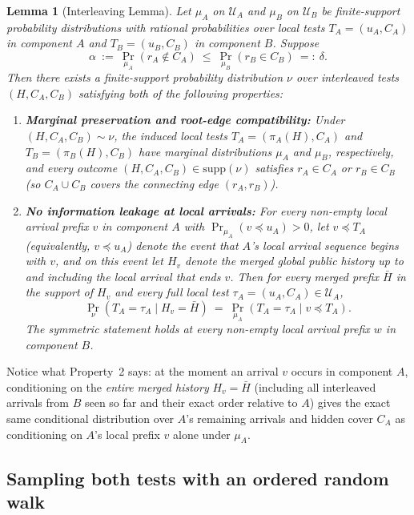 \documentclass[11pt,letterpaper]{article}
\newtheorem{lemma}{Lemma}[section]
\begin{document}
\begin{lemma}[Interleaving Lemma]\label{lem:interleaving}
Let $\mu_A$ on $\mathcal U_A$ and $\mu_B$ on $\mathcal U_B$ be finite-support probability distributions with rational probabilities over local tests $T_A=(u_A,C_A)$ in component $A$ and $T_B=(u_B,C_B)$ in component $B$. Suppose
\[
  \alpha\ :=\ \Pr_{\mu_A}(r_A\notin C_A)\ \le\ \Pr_{\mu_B}(r_B\in C_B)\ =:\ \delta .
\]
Then there exists a finite-support probability distribution $\nu$ over interleaved tests $(H,C_A,C_B)$ satisfying both of the following properties:
\begin{enumerate}
\item \textbf{Marginal preservation and root-edge compatibility:} Under $(H,C_A,C_B)\sim\nu$, the induced local tests $T_A=(\pi_A(H),C_A)$ and $T_B=(\pi_B(H),C_B)$ have marginal distributions $\mu_A$ and $\mu_B$, respectively, and every outcome $(H,C_A,C_B)\in\mathrm{supp}(\nu)$ satisfies $r_A\in C_A$ or $r_B\in C_B$ (so $C_A\cup C_B$ covers the connecting edge $(r_A,r_B)$).
\item \textbf{No information leakage at local arrivals:} For every non-empty local arrival prefix $v$ in component $A$ with $\Pr_{\mu_A}(v\preceq u_A)>0$, let $v\preceq T_A$ (equivalently, $v\preceq u_A$) denote the event that $A$'s local arrival sequence begins with $v$, and on this event let $H_v$ denote the merged global public history up to and including the local arrival that ends $v$. Then for every merged prefix $\bar H$ in the support of $H_v$ and every full local test $\tau_A=(u_A,C_A)\in\mathcal U_A$,
\[
  \Pr_\nu(T_A=\tau_A\mid H_v=\bar H)\ =\ \Pr_{\mu_A}(T_A=\tau_A\mid v\preceq T_A).
\]
The symmetric statement holds at every non-empty local arrival prefix $w$ in component $B$.
\end{enumerate}
\end{lemma}

Notice what Property~2 says: at the moment an arrival $v$ occurs in component $A$, conditioning on the \emph{entire merged history} $H_v=\bar H$ (including all interleaved arrivals from $B$ seen so far and their exact order relative to $A$) gives the exact same conditional distribution over $A$'s remaining arrivals and hidden cover $C_A$ as conditioning on $A$'s local prefix $v$ alone under $\mu_A$.

\subsection{Sampling both tests with an ordered random walk}
\end{document}
